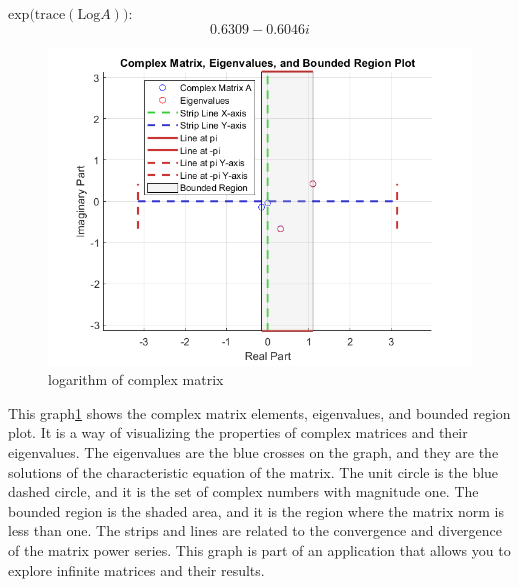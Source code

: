 $\text{exp(trace}(\text{Log}A))$:
\[
0.6309 - 0.6046i
\]
\begin{center}
   \begin{figure}
    \centering
    \includegraphics[width=0.8\linewidth]{Figures/eeeeeeeeeeeeeeeeeee.png}
    \caption{logarithm of complex matrix}
    \label{fig:complex}
    \end{figure} 
\end{center}

This graph\ref{fig:complex} shows the complex matrix elements, eigenvalues, and bounded region plot. It is a way of visualizing the properties of complex matrices and their eigenvalues. The eigenvalues are the blue crosses on the graph, and they are the solutions of the characteristic equation of the matrix. The unit circle is the blue dashed circle, and it is the set of complex numbers with magnitude one. The bounded region is the shaded area, and it is the region where the matrix norm is less than one. The strips and lines are related to the convergence and divergence of the matrix power series. This graph is part of an application that allows you to explore infinite matrices and their results.
